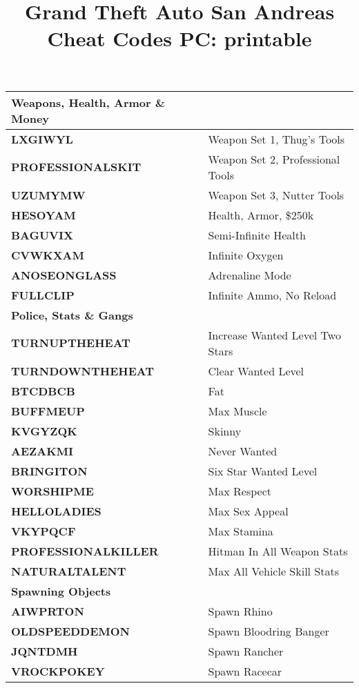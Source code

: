 \documentclass{article}
\title{Grand Theft Auto San Andreas Cheat Codes PC: printable}
\date{}
\begin{document}
\maketitle
\begin{small}
	\begin{longtable}{|l l|}
	\hline
	\textbf{Weapons, Health, Armor \& Money}& \\
	\hline
	\textbf{LXGIWYL }& Weapon Set 1, Thug's Tools \\
	\textbf{PROFESSIONALSKIT }& Weapon Set 2, Professional Tools \\
	\textbf{UZUMYMW }& Weapon Set 3, Nutter Tools \\
	\textbf{HESOYAM }& Health, Armor, \$250k \\
	\textbf{BAGUVIX }& Semi-Infinite Health \\
	\textbf{CVWKXAM }& Infinite Oxygen \\
	\textbf{ANOSEONGLASS }& Adrenaline Mode \\
	\textbf{FULLCLIP }& Infinite Ammo, No Reload \\
	\hline
	\hline
	\textbf{Police, Stats \& Gangs}& \\
	\hline
	\textbf{TURNUPTHEHEAT }& Increase Wanted Level Two Stars \\
	\textbf{TURNDOWNTHEHEAT }& Clear Wanted Level \\
	\textbf{BTCDBCB }& Fat \\
	\textbf{BUFFMEUP }& Max Muscle \\
	\textbf{KVGYZQK }& Skinny \\
	\textbf{AEZAKMI }& Never Wanted \\
	\textbf{BRINGITON }& Six Star Wanted Level \\
	\textbf{WORSHIPME }& Max Respect \\
	\textbf{HELLOLADIES }& Max Sex Appeal \\
	\textbf{VKYPQCF }& Max Stamina \\
	\textbf{PROFESSIONALKILLER }& Hitman In All Weapon Stats \\
	\textbf{NATURALTALENT }& Max All Vehicle Skill Stats \\
	\hline
	\hline
	\textbf{Spawning Objects}& \\
	\hline
	\textbf{AIWPRTON }& Spawn Rhino \\
	\textbf{OLDSPEEDDEMON }& Spawn Bloodring Banger \\
	\textbf{JQNTDMH }& Spawn Rancher \\
	\textbf{VROCKPOKEY }& Spawn Racecar \\

\end{longtable}
\end{small}
\end{document}
